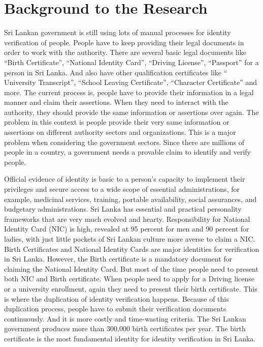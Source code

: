 \section{Background to the Research}
\vspace{12pt}


Sri Lankan government is still using lots of manual processes for identity verification of people. 
People have to keep providing their legal documents in order to work with the authority. There are 
several basic legal documents like “Birth Certificate”, “National Identity Card”, “Driving License”, 
“Passport”  for a person in Sri Lanka. And also have other qualification certificates like “ University 
Transcript”, “School Leaving Certificate”, “Character Certificate” and more. The current process is, 
people have to provide their information in a legal manner and claim their assertions. When they need 
to interact with the authority, they should provide the same information or assertions over again. 
The problem in this context is people provide their very same information or assertions on different 
authority sectors and organizations. This is a major problem when considering the government sectors. 
Since there are millions of people in a country, a government needs a provable claim to identify and 
verify people. 

\vspace{12pt}


Official evidence of identity is basic to a person's capacity to implement their privileges and secure 
access to a wide scope of essential administrations, for example, medicinal services, training, portable 
availability, social assurances, and budgetary administrations. Sri Lanka has essential and practical 
personality frameworks that are very much evolved and hearty. Responsibility for National Identity Card 
(NIC) is high, revealed at 95 percent for men and 90 percent for ladies, with just little pockets of Sri 
Lankan culture more averse to claim a NIC. Birth Certificates and National Identity Cards are major 
identities for verification in Sri Lanka. However, the Birth certificate is a mandatory document for 
claiming the National Identity Card. But most of the time people need to present both NIC and Birth 
certificate. When people need to apply for a Driving license or a university enrollment, again they 
need to present their birth certificate. This is where the duplication of identity verification happens.
 Because of this duplication process, people have to submit their verification documents continuously. 
 And it is more costly and time-wasting criteria. The Sri Lankan government produces more than 300,000 
 birth certificates per year. The birth certificate is the most fundamental identity for identity verification 
 in Sri Lanka.

